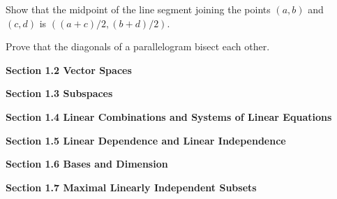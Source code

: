 \documentclass[11pt,largemargins]{homework}
\begin{document}
\question
Show that the midpoint of the line segment joining the points $(a,b)$ and $(c,d)$ is $((a+c)/2, (b+d)/2)$.

\question
Prove that the diagonals of a parallelogram bisect each other.


\hfill 

\textbf{\large{Section 1.2} Vector Spaces}
\setcounter{questionCounter}{0}
\question

\question

\question

\question

\question


\textbf{\large{Section 1.3} Subspaces}
\setcounter{questionCounter}{0}
\question

\question

\question

\question

\question


\hfill 

\textbf{\large{Section 1.4} Linear Combinations and Systems of Linear Equations}
\setcounter{questionCounter}{0}
\question

\question

\question

\question

\question


\hfill 

\textbf{\large{Section 1.5} Linear Dependence and Linear Independence}
\setcounter{questionCounter}{0}
\question

\question

\question

\question

\question


\hfill 

\textbf{\large{Section 1.6} Bases and Dimension}
\setcounter{questionCounter}{0}
\question

\question

\question

\question

\question


\hfill 

\textbf{\large{Section 1.7} Maximal Linearly Independent Subsets}
\setcounter{questionCounter}{0}
\question

\question

\question

\question

\question

\question

\question

\question

\question

\question
\end{document}
